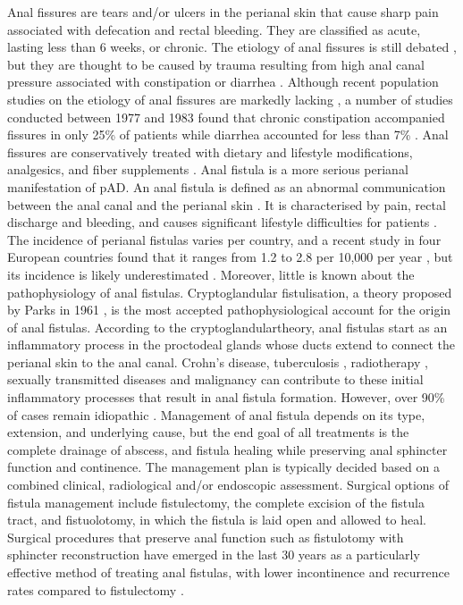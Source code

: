 Anal fissures are tears and/or ulcers in the perianal skin that cause sharp pain associated with defecation and rectal bleeding. They are classified as acute, lasting less than 6 weeks, or chronic. The etiology of anal fissures is still debated \cite{Beaty2016-yj}, but they are thought to be caused by trauma resulting from high anal canal pressure associated with constipation or diarrhea \cite{Mapel2014-wp}. Although recent population studies on the etiology of anal fissures are markedly lacking \cite{Mapel2014-wp}, a number of studies conducted between 1977 and 1983 found that chronic constipation accompanied fissures in only 25\% of patients while diarrhea accounted for less than 7\% \cite{Keighley2018-iy,McDonald1983-cs,Lock1977-go}. Anal fissures are conservatively treated with dietary and lifestyle modifications, analgesics, and fiber supplements \cite{nice_analfiss}. Anal fistula is a more serious perianal manifestation of pAD. An anal fistula is defined as an abnormal communication between the anal canal and the perianal skin \cite{Sneider2013-qd}. It is characterised by pain, rectal discharge and bleeding, and causes significant lifestyle difficulties for patients \cite{Mei2019-ds}. The incidence of perianal fistulas varies per country, and a recent study in four European countries found that it ranges from 1.2 to 2.8 per 10,000 per year \cite{Zanotti2007-mb}, but its incidence is likely underestimated \cite{Eberspacher2022-sp}. Moreover, little is known about the pathophysiology of anal fistulas. Cryptoglandular fistulisation, a theory proposed by Parks in 1961 \cite{Parks1961-pe,Wlodarczyk2021-kh}, is the most accepted pathophysiological account for the origin of anal fistulas. According to the cryptoglandulartheory, anal fistulas start as an inflammatory process in the proctodeal glands whose ducts extend to connect the perianal skin to the anal canal. Crohn's disease, tuberculosis \cite{Dudukgian2011-is}, radiotherapy \cite{Johnston2003-jr}, sexually transmitted diseases \cite{Assi2014-at} and malignancy can contribute to these initial inflammatory processes that result in anal fistula formation. However, over 90\% of cases remain idiopathic \cite{Simpson2012-gi}. Management of anal fistula depends on its type, extension, and underlying cause, but the end goal of all treatments is the complete drainage of abscess, and fistula healing while preserving anal sphincter function and continence. The management plan is typically decided based on a combined clinical, radiological and/or endoscopic assessment. Surgical options of fistula management include fistulectomy, the complete excision of the fistula tract, and fistuolotomy, in which the fistula is laid open and allowed to heal. Surgical procedures that preserve anal function such as fistulotomy with sphincter reconstruction have emerged in the last 30 years as a particularly effective method of treating anal fistulas, with lower incontinence and recurrence rates compared to fistulectomy \cite{Arroyo2012-qa,Jain2012-or}. \\

